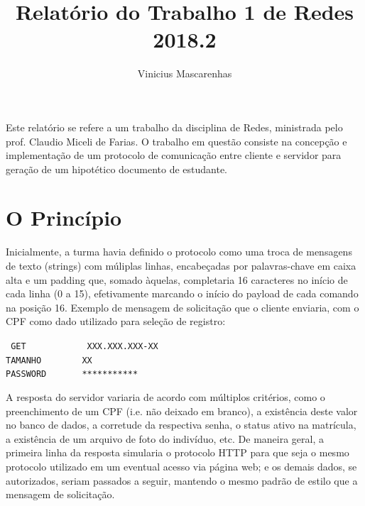 \documentclass[12pt]{article}
\title{Relatório do Trabalho 1 de Redes\\ 2018.2}
\author{Vinicius Mascarenhas\inst{1}}
\def\code #1{\texttt{#1}}
\def\codeIndent{60pt}
\begin{document}
 

\maketitle

\begin{resumo} 
Este relatório se refere a um trabalho da disciplina de Redes, ministrada pelo prof. Claudio Miceli de Farias. O trabalho em questão consiste na concepção e implementação de um protocolo de comunicação entre cliente e servidor para geração de um hipotético documento de estudante.
\end{resumo}

\section{O Princípio}

Inicialmente, a turma havia definido o protocolo como uma troca de mensagens de texto (strings) com múliplas linhas, encabeçadas por palavras-chave em caixa alta e um padding que, somado àquelas, completaria 16 caracteres no início de cada linha (0 a 15), efetivamente marcando o início do payload de cada comando na posição 16. Exemplo de mensagem de solicitação que o cliente enviaria, com o CPF como dado utilizado para seleção de registro:

\noindent\code{
\hspace*{\codeIndent}GET\ \ \ \ \ \ \ \ \ \ \ \ XXX.XXX.XXX-XX\\
\hspace*{\codeIndent} TAMANHO\ \ \ \ \ \ \ \ XX\\
\hspace*{\codeIndent} PASSWORD\ \ \ \ \ \ \ ***********\\
}

A resposta do servidor variaria de acordo com múltiplos critérios, como o preenchimento de um CPF (i.e. não deixado em branco), a existência deste valor no banco de dados, a corretude da respectiva senha, o status ativo na matrícula, a existência de um arquivo de foto do indivíduo, etc. De maneira geral, a primeira linha da resposta simularia o protocolo HTTP para que seja o mesmo protocolo utilizado em um eventual acesso via página web; e os demais dados, se autorizados, seriam passados a seguir, mantendo o mesmo padrão de estilo que a mensagem de solicitação.
\end{document}
